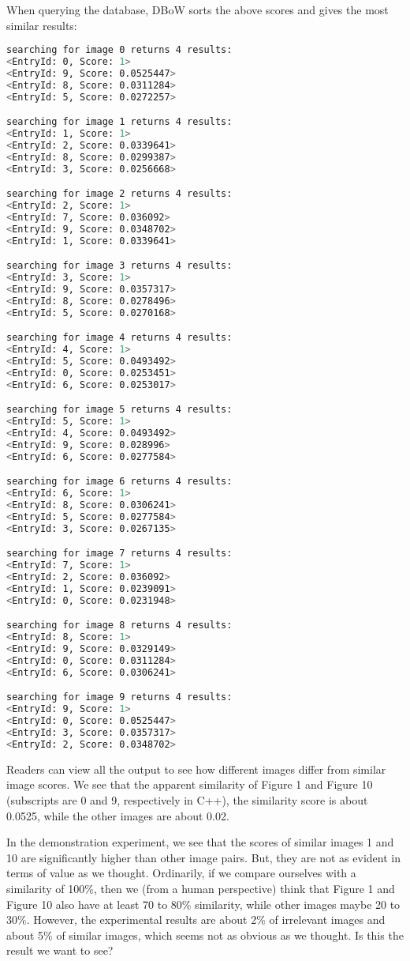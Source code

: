 When querying the database, DBoW sorts the above scores and gives the most similar results:
\begin{lstlisting}[language=sh,caption=Terminal output:]
searching for image 0 returns 4 results:
<EntryId: 0, Score: 1>
<EntryId: 9, Score: 0.0525447>
<EntryId: 8, Score: 0.0311284>
<EntryId: 5, Score: 0.0272257>

searching for image 1 returns 4 results:
<EntryId: 1, Score: 1>
<EntryId: 2, Score: 0.0339641>
<EntryId: 8, Score: 0.0299387>
<EntryId: 3, Score: 0.0256668>

searching for image 2 returns 4 results:
<EntryId: 2, Score: 1>
<EntryId: 7, Score: 0.036092>
<EntryId: 9, Score: 0.0348702>
<EntryId: 1, Score: 0.0339641>

searching for image 3 returns 4 results:
<EntryId: 3, Score: 1>
<EntryId: 9, Score: 0.0357317>
<EntryId: 8, Score: 0.0278496>
<EntryId: 5, Score: 0.0270168>

searching for image 4 returns 4 results:
<EntryId: 4, Score: 1>
<EntryId: 5, Score: 0.0493492>
<EntryId: 0, Score: 0.0253451>
<EntryId: 6, Score: 0.0253017>

searching for image 5 returns 4 results:
<EntryId: 5, Score: 1>
<EntryId: 4, Score: 0.0493492>
<EntryId: 9, Score: 0.028996>
<EntryId: 6, Score: 0.0277584>

searching for image 6 returns 4 results:
<EntryId: 6, Score: 1>
<EntryId: 8, Score: 0.0306241>
<EntryId: 5, Score: 0.0277584>
<EntryId: 3, Score: 0.0267135>

searching for image 7 returns 4 results:
<EntryId: 7, Score: 1>
<EntryId: 2, Score: 0.036092>
<EntryId: 1, Score: 0.0239091>
<EntryId: 0, Score: 0.0231948>

searching for image 8 returns 4 results:
<EntryId: 8, Score: 1>
<EntryId: 9, Score: 0.0329149>
<EntryId: 0, Score: 0.0311284>
<EntryId: 6, Score: 0.0306241>

searching for image 9 returns 4 results:
<EntryId: 9, Score: 1>
<EntryId: 0, Score: 0.0525447>
<EntryId: 3, Score: 0.0357317>
<EntryId: 2, Score: 0.0348702>
\end{lstlisting}

Readers can view all the output to see how different images differ from similar image scores. We see that the apparent similarity of Figure 1 and Figure 10 (subscripts are 0 and 9, respectively in C++), the similarity score is about 0.0525, while the other images are about 0.02.

In the demonstration experiment, we see that the scores of similar images 1 and 10 are significantly higher than other image pairs. But, they are not as evident in terms of value as we thought. Ordinarily, if we compare ourselves with a similarity of 100\%, then we (from a human perspective) think that Figure 1 and Figure 10 also have at least 70 to 80\% similarity, while other images maybe 20 to 30\%. However, the experimental results are about 2\% of irrelevant images and about 5\% of similar images, which seems not as obvious as we thought. Is this the result we want to see?

